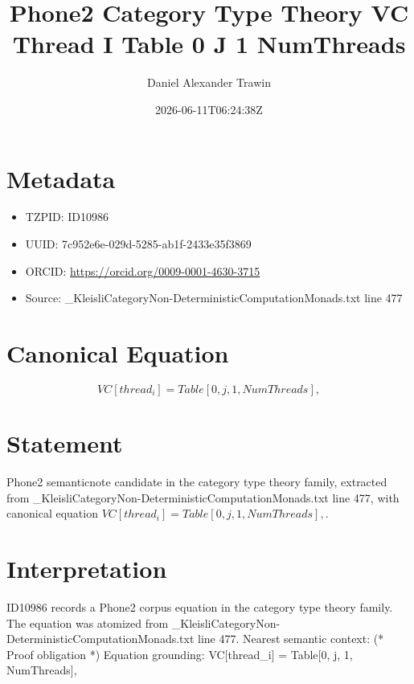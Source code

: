 \documentclass[11pt]{article}
\title{Phone2 Category Type Theory VC Thread I Table 0 J 1 NumThreads}
\author{Daniel Alexander Trawin}
\date{2026-06-11T06:24:38Z}
\begin{document}
\maketitle
\section*{Metadata}
\begin{itemize}
\item TZPID: ID10986
\item UUID: 7c952e6e-029d-5285-ab1f-2433e35f3869
\item ORCID: \url{https://orcid.org/0009-0001-4630-3715}
\item Source: _KleisliCategoryNon-DeterministicComputationMonads.txt line 477
\end{itemize}
\section*{Canonical Equation}
\[
VC[thread_i] = Table[0, {j, 1, NumThreads}],
\]
\section*{Statement}
Phone2 semanticnote candidate in the category type theory family, extracted from _KleisliCategoryNon-DeterministicComputationMonads.txt line 477, with canonical equation $VC[thread_i] = Table[0, {j, 1, NumThreads}],$.
\section*{Interpretation}
ID10986 records a Phone2 corpus equation in the category type theory family. The equation was atomized from _KleisliCategoryNon-DeterministicComputationMonads.txt line 477. Nearest semantic context: (* Proof obligation *) Equation grounding: VC[thread_i] = Table[0, {j, 1, NumThreads}],
\end{document}
